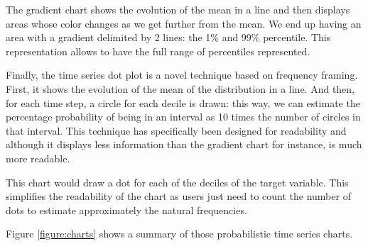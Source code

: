 \documentclass[a4paper,3p,sort&compress]{elsarticle}
\begin{document}
The gradient chart shows the evolution of the mean in a line and then displays areas whose 
color changes as we get further from the mean. We end up having an area with a gradient 
delimited by 2 lines: the 1\% and 99\% percentile. This representation allows to have the
 full range of percentiles represented.

Finally, the time series dot plot is a novel technique based on frequency framing. First, 
it shows the evolution of the mean of the distribution in a line. And then, for each time 
step, a circle for each decile is drawn: this way, we can estimate the percentage 
probability of being in an interval as 10 times the number of circles in that interval. 
This technique has 
specifically been designed for readability and although it displays less information than 
the gradient chart for instance, is much more readable.

This chart would draw a dot for each of the deciles of the target variable. This simplifies the 
readability of the chart as users just need to count the number of dots to estimate approximately 
the natural frequencies.

Figure \ref{figure:charts} shows a summary of those probabilistic time series charts.
\end{document}
